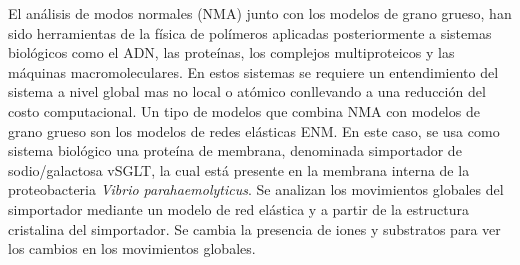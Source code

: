 El an\'{a}lisis de modos normales (NMA) junto con los modelos de grano grueso, han sido herramientas de la f\'{i}sica de pol\'{i}meros aplicadas posteriormente a sistemas biol\'{o}gicos como el ADN, las prote\'{i}nas, los complejos multiproteicos y  las m\'{a}quinas macromoleculares. En estos sistemas se requiere un entendimiento del sistema a nivel global mas no local o at\'{o}mico conllevando a una  reducci\'{o}n del costo computacional. Un tipo de modelos que combina NMA con modelos de grano grueso son los modelos de redes el\'{a}sticas ENM. En este caso, se usa como sistema biol\'{o}gico una prote\'{i}na de membrana, denominada simportador de sodio/galactosa vSGLT, la cual est\'{a} presente en la membrana interna de la proteobacteria \textit{Vibrio parahaemolyticus}. Se analizan los movimientos globales del simportador mediante un modelo de red el\'{a}stica y a partir de la estructura cristalina del simportador. Se cambia la presencia de iones y substratos para ver los cambios en los movimientos globales.\\

